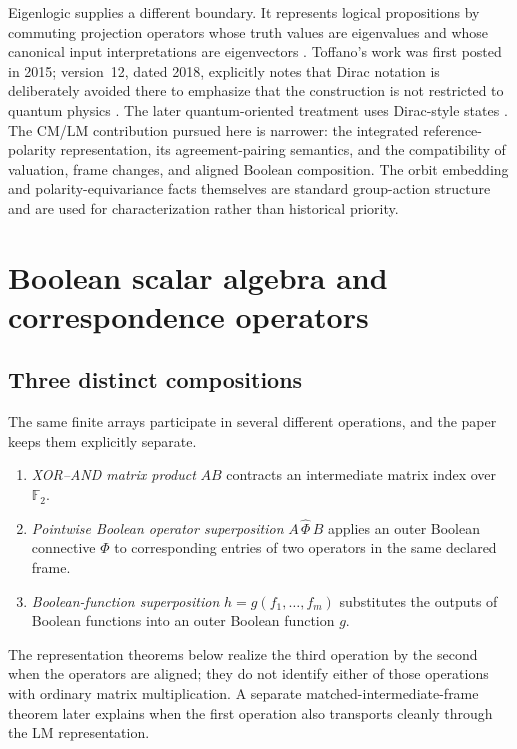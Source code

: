 \documentclass[11pt]{article}
\theoremstyle{definition}
\theoremstyle{remark}
\newcommand{\F}{\mathbb F}
\begin{document}
Eigenlogic supplies a different boundary.  It represents logical propositions by commuting projection operators whose truth values are eigenvalues and whose canonical input interpretations are eigenvectors \cite{Toffano2015,DuboisToffano2016}.  Toffano's work was first posted in 2015; version~12, dated 2018, explicitly notes that Dirac notation is deliberately avoided there to emphasize that the construction is not restricted to quantum physics \cite{Toffano2015}.  The later quantum-oriented treatment uses Dirac-style states \cite{DuboisToffano2016}.  The CM/LM contribution pursued here is narrower: the integrated reference-polarity representation, its agreement-pairing semantics, and the compatibility of valuation, frame changes, and aligned Boolean composition.  The orbit embedding and polarity-equivariance facts themselves are standard group-action structure and are used for characterization rather than historical priority.

\section{Boolean scalar algebra and correspondence operators}
\label{sec:cm}

\subsection{Three distinct compositions}

The same finite arrays participate in several different operations, and the paper keeps them explicitly separate.
\begin{enumerate}
\item \emph{XOR--AND matrix product} $AB$ contracts an intermediate matrix index over $\F_2$.
\item \emph{Pointwise Boolean operator superposition} $A\,\widehat\Phi\,B$ applies an outer Boolean connective $\Phi$ to corresponding entries of two operators in the same declared frame.
\item \emph{Boolean-function superposition} $h=g(f_1,\ldots,f_m)$ substitutes the outputs of Boolean functions into an outer Boolean function $g$.
\end{enumerate}
The representation theorems below realize the third operation by the second when the operators are aligned; they do not identify either of those operations with ordinary matrix multiplication.  A separate matched-intermediate-frame theorem later explains when the first operation also transports cleanly through the LM representation.
\end{document}
